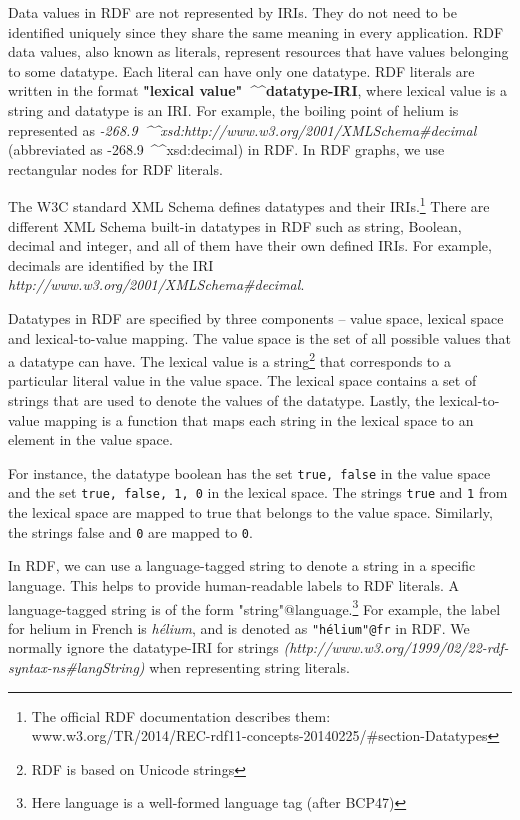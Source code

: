Data values in RDF are not represented by IRIs. They do not need to be identified uniquely since they share the same meaning in every application. RDF data values, also known as literals, represent resources that have values belonging to some datatype. Each literal can have only one datatype. RDF literals are written in the format \textbf{"lexical value"~\textasciicircum \textasciicircum datatype-IRI}, where lexical value is a string and datatype is an IRI. For example, the boiling point of helium is represented as \textit{-268.9~\textasciicircum \textasciicircum xsd:http://www.w3.org/2001/XMLSchema\#decimal} (abbreviated as -268.9~\textasciicircum \textasciicircum xsd:decimal) in RDF. In RDF graphs, we use rectangular nodes for RDF literals.

The W3C standard XML Schema defines datatypes and their IRIs.\footnote{The official RDF documentation describes them: www.w3.org/TR/2014/REC-rdf11-concepts-20140225/\#section-Datatypes} There are different XML Schema built-in datatypes in RDF such as string, Boolean, decimal and integer, and all of them have their own defined IRIs. For example, decimals are identified by the IRI \textit{http://www.w3.org/2001/XMLSchema\#decimal}. 

Datatypes in RDF are specified by three components – value space, lexical space and lexical-to-value mapping. The value space is the set of all possible values that a datatype can have. The lexical value is a string\footnote{RDF is based on Unicode strings} that corresponds to a particular literal value in the value space. The lexical space contains a set of strings that are used to denote the values of the datatype. Lastly, the lexical-to-value mapping is a function that maps each string in the lexical space to an element in the value space. 

For instance, the datatype boolean has the set \texttt{{true, false}} in the value space and the set \texttt{{true, false, 1, 0}} in the lexical space. The strings \texttt{true} and \texttt{1} from the lexical space are mapped to true that belongs to the value space. Similarly, the strings false and \texttt{0} are mapped to \texttt{0}. 

In RDF, we can use a language-tagged string to denote a string in a specific language. This helps to provide human-readable labels to RDF literals. A language-tagged string is of the form "string"@language.\footnote{Here language is a well-formed language tag (after BCP47)} For example, the label for helium in French is \textit{hélium}, and is denoted as \texttt{"hélium"@fr} in RDF. We normally ignore the datatype-IRI for strings \textit{(http://www.w3.org/1999/02/22-rdf-syntax-ns\#langString)} when representing string literals. 


